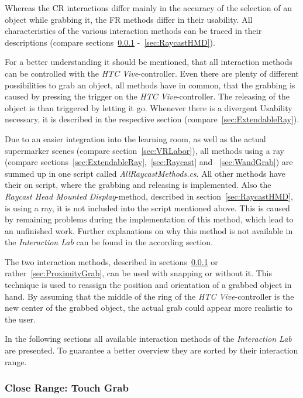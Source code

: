Whereas the CR interactions differ mainly in the accuracy of the selection of an object while grabbing it, the FR methods differ in their usability. All characteristics of the various interaction methods can be traced in their descriptions (compare sections~\ref{sec:TouchGrab} -~\ref{sec:RaycastHMD}).

For a better understanding it should be mentioned, that all interaction methods can be controlled with the \textit{HTC Vive}-controller. Even there are plenty of different possibilities to grab an object, all methods have in common, that the grabbing is caused by pressing the trigger on the \textit{HTC Vive}-controller. The releasing of the object is than triggered by letting it go. Whenever there is a divergent Usability necessary, it is described in the respective section (compare~\ref{sec:ExtendableRay}).

Due to an easier integration into the learning room, as well as the actual supermarker scenes (compare section~\ref{sec:VRLabor}), all methods using a ray (compare sections~\ref{sec:ExtendableRay},~\ref{sec:Raycast} and ~\ref{sec:WandGrab}) are summed up in one script called \textit{AllRaycastMethods.cs}. All other methods have their on script, where the grabbing and releasing is implemented. Also the \textit{Raycast Head Mounted Display}-method, described in section~\ref{sec:RaycastHMD}, is using a ray, it is not included into the script mentioned above. This is caused by remaining problems during the implementation of this method, which lead to an unfinished work. Further explanations on why this method is not available in the \textit{Interaction Lab} can be found in the according section.

The two interaction methods, described in sections~\ref{sec:TouchGrab} or rather~\ref{sec:ProximityGrab}, can be used with snapping or without it. This technique is used to reassign the position and orientation of a grabbed object in hand. By assuming that the middle of the ring of the \textit{HTC Vive}-controller is the new center of the grabbed object, the actual grab could appear more realistic to the user. 

In the following sections all available interaction methods of the \textit{Interaction Lab} are presented. To guarantee a better overview they are sorted by their interaction range. 

\subsubsection{Close Range: Touch Grab} \label{sec:TouchGrab}

